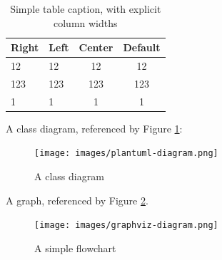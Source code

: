 \documentclass[a4paper, ]{article}
\begin{document}
    \begin{table}[h]
        \caption{Simple table caption, with explicit column widths}
        \label{tab:my-simple-table-explicit}
        \centering
        \begin{tabular}{|p{2cm}|p{1cm}|c|c|}
            \hline
            \bfseries{Right} &
            \bfseries{Left} &
            \bfseries{Center} &
            \bfseries{Default} \\
            \hline
            12 &
            12 &
            12 &
            12 \\
            \hline
            123 &
            123 &
            123 &
            123 \\
            \hline
            1 &
            1 &
            1 &
            1 \\
            \hline
        \end{tabular}
    \end{table}

    A  class diagram, referenced by Figure
    \ref{fig:plantuml-diagram}:

    \begin{figure}[H]
        \centering
        \texttt{[image: images/plantuml-diagram.png]}
        \caption{A class diagram}
        \label{fig:plantuml-diagram}
    \end{figure}

    A  graph, referenced by Figure
    \ref{fig:graphviz-diagram}.

    \begin{figure}[H]
        \centering
        \texttt{[image: images/graphviz-diagram.png]}
        \caption{A simple flowchart}
        \label{fig:graphviz-diagram}
    \end{figure}


    \clearpage
    
    
    
    \clearpage
    \printglossary[type=\acronymtype]
    \clearpage
    \printglossary
\end{document}
